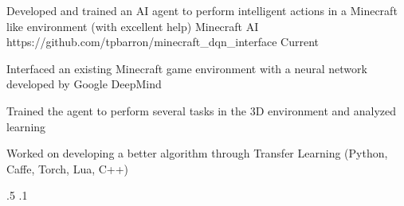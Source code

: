 \begin{cventries}

\myProject
{Developed and trained an AI agent to perform intelligent actions in a Minecraft like environment (with excellent help)} %
{Minecraft AI} %
{https://github.com/tpbarron/minecraft\_dqn\_interface} %
{Current} %
{ %
\begin{cvitems}
\item {Interfaced an existing Minecraft game environment with a neural network developed by Google DeepMind}
\item {Trained the agent to perform several tasks in the 3D environment and analyzed learning}
\item {Worked on developing a better algorithm through Transfer Learning (Python, Caffe, Torch, Lua, C++)}
\end{cvitems}
}
{.5}
{.1}



\end{cventries}